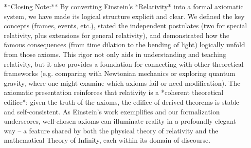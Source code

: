 \documentclass{article}
\begin{document}
**Closing Note:** By converting Einstein’s *Relativity* into a formal axiomatic system, we have made its logical structure explicit and clear. We defined the key concepts (frames, events, etc.), stated the independent postulates (two for special relativity, plus extensions for general relativity), and demonstrated how the famous consequences (from time dilation to the bending of light) logically unfold from those axioms. This rigor not only aids in understanding and teaching relativity, but it also provides a foundation for connecting with other theoretical frameworks (e.g. comparing with Newtonian mechanics or exploring quantum gravity, where one might examine which axioms fail or need modification). The axiomatic presentation reinforces that relativity is a *coherent theoretical edifice*: given the truth of the axioms, the edifice of derived theorems is stable and self-consistent. As Einstein’s work exemplifies and our formalization underscores, well-chosen axioms can illuminate reality in a profoundly elegant way – a feature shared by both the physical theory of relativity and the mathematical Theory of Infinity, each within its domain of discourse.
\end{document}
